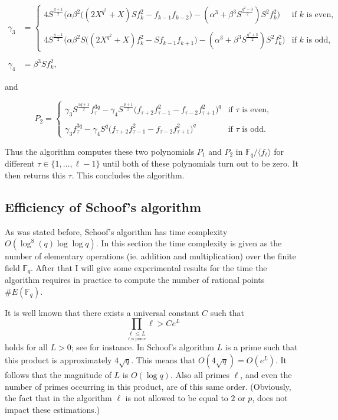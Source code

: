 \documentclass{article}
\numberwithin{equation}{section}
\theoremstyle{definition}
\newcommand{\FF}[1]{{\mathbb F}_{#1}} %
\newcommand{\grgen}[1]{\langle #1 \rangle} %
\begin{document}
\begin{align*}
\gamma_3 &= \left \{ \begin{array}{ll} 4S^{\frac{q+1}{2}} \Big(\alpha\beta^2 \big((2X^{q^2} +X)Sf_k^2 - f_{k-1}f_{k-2} \big) - ( \alpha^3+\beta^3S^{\frac{q^2-3}{2}})S^2 f_k^2\Big) &\text{if $k$ is even,} \\ \\
4S^{\frac{q-1}{2}} \Big(\alpha \beta^2 S \big((2X^{q^2}+X) f_k^2 - Sf_{k-1}f_{k+1}\big)-(\alpha^3+\beta^3S^{\frac{q^2+3}{2}})S^2f_k^2\Big) &\text{if $k$ is odd,}\end{array}\\ \\
\gamma_4 &= \beta^3Sf_k^2,
\end{align*}

and

$$P_2=\left\{ \begin{array}{ll} \gamma_3 S^{\frac{3q+1}{2}}f_\tau^{3q} -\gamma_4 S^{\frac{q+1}{2}}\big(f_{\tau+2}f_{\tau-1}^2 - f_{\tau-2} f_{\tau+1}^2 \big)^q &\text{if $\tau$ is even,} \\ \\
\gamma_3 f_\tau^{3q} - \gamma_4S^q\big(f_{\tau+2}f_{\tau-1}^2 - f_{\tau-2} f_{\tau+1}^2 \big)^q &\text{if $\tau$ is odd.} \end{array}$$

Thus the algorithm computes these two polynomials $P_1$ and $P_2$ in $\FF{q}/\grgen{f_\ell}$ for different $\tau \in \{1,\ldots,\ell-1\}$ until both of these polynomials turn out to be zero. It then returns this $\tau$. This concludes the algorithm.



\subsection{Efficiency of Schoof's algorithm}
As was stated before, Schoof's algorithm has time  complexity $O(\log ^8 (q) \log \log q)$. In this section the time complexity is given as the number of elementary operations (ie. addition and multiplication) over the finite field $\FF{q}$.  After that I will give some experimental results for the time the algorithm requires in practice to compute the number of rational points $\#E(\FF{q})$.\par 
It is well known that there exists a universal constant $C$ such that $$\underset{\underset{\ell \text{ is prime}}{\ell \leq L}}{\prod} \ell > C e^L$$ holds for all $L>0$; see \cite{Rosser} for instance. In Schoof's algorithm $L$ is a prime such that this product is approximately $4\sqrt{q}$. This means that $O(4 \sqrt{q}) = O(e^L)$. It follows that the magnitude of $L$ is $O(\log q)$. Also all primes $\ell$, and even the number of primes occurring in this product, are of this same order. (Obviously, the fact that in the algorithm $\ell$ is not allowed to be equal to $2$ or $p$, does not impact these estimations.)
\end{document}
